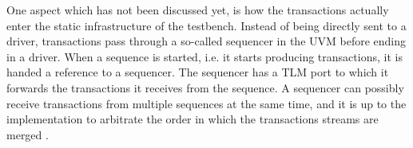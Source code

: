 \documentclass[11pt]{report}
\begin{document}
One aspect which has not been discussed yet, is how the transactions actually enter the static infrastructure of the testbench. Instead of being directly sent to a driver, transactions pass through a so-called sequencer in the UVM before ending in a driver. When a sequence is started, i.e. it starts producing transactions, it is handed a reference to a sequencer. The sequencer has a TLM port to which it forwards the transactions it receives from the sequence. A sequencer can possibly receive transactions from multiple sequences at the same time, and it is up to the implementation to arbitrate the order in which the transactions streams are merged \cite[Ch. 23]{salemi2013uvm}.

\begin{comment}
\cite[Ch. 23]{salemi2013uvm}
- in order to make testbench reusable, structure should be separated from data i.e. Transactions
- this also includes the stimulus that is the ordered sequences of transactions
- the ordered sequences could also be used across different test cases -> test case should not decide the specific transactions
- instead test case could operate on collections of transactions which are used like a library


\cite[Ch. 4.3]{mehta2018asic}
- sequence items are the base class for transactions in the UVM
- just class which consist of random and non-random fields with constraints
- sequences represent a stream of sequence items
- in the code they resemble generators
- a body method is invoked and new sequence items are produced as part of the sequence by calling a method
- a special thing is through that when a sequence item is produced, a response may also be obtained which could be another transaction type
- the start\_item method passes the reference to the sequence item to the receiver and waits until a receiver is ready
- when finish\_item is called, the receiver is informed that the item is valid and can be processed
- the sequence is paused until the receiver signals that it is done with the item and a response item may follow that confirmation


\cite[Ch. 23]{salemi2013uvm}
- but what if we want to compose sequences such that the combination is reusable
- can't be done in the test case
- instead a virtual sequence can be used
- it can play other sequences in its body
- sequences can be played in parallel and may be sent to different targets
- this gives control on how interactions on different interfaces are interleaved

\end{comment}
\end{document}
